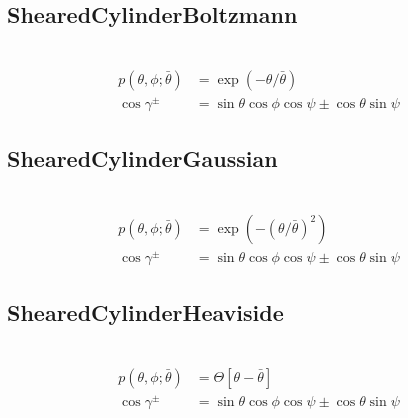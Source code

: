 

\newpage
\subsection{ShearedCylinderBoltzmann} ~\\

\begin{align}
p(\theta,\phi;\bar{\theta}) & = \exp(-\theta/\bar{\theta}) \\
\cos\gamma^\pm & = \sin\theta\cos\phi\cos\psi\pm\cos\theta\sin\psi
\end{align}


\newpage
\subsection{ShearedCylinderGaussian}
\label{sect:ShearedCylinderGaussian}
~\\
\begin{align}
p(\theta,\phi;\bar{\theta}) & = \exp(-(\theta/\bar{\theta})^2) \\
\cos\gamma^\pm & = \sin\theta\cos\phi\cos\psi\pm\cos\theta\sin\psi
\end{align}


\newpage
\subsection{ShearedCylinderHeaviside} ~\\

\begin{align}
p(\theta,\phi;\bar{\theta}) & = \Theta[\theta-\bar{\theta}] \\
\cos\gamma^\pm & = \sin\theta\cos\phi\cos\psi\pm\cos\theta\sin\psi
\end{align}

%

